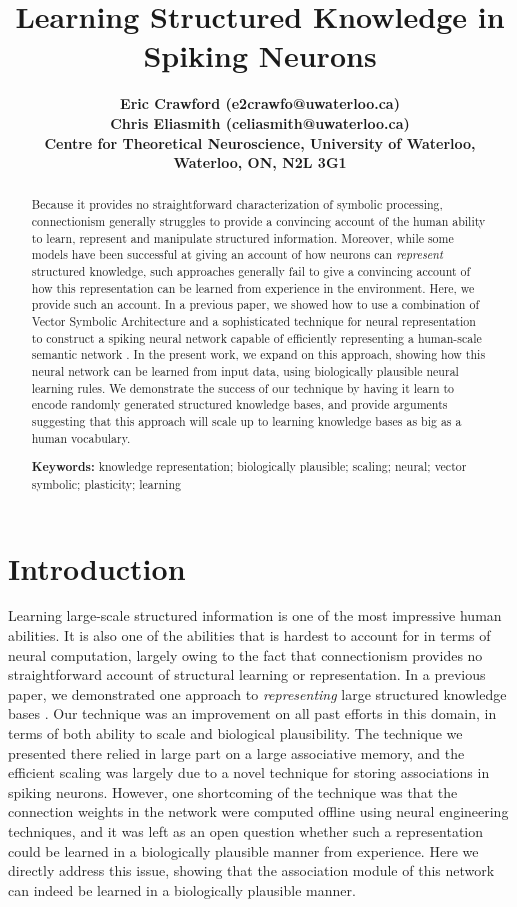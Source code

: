 \documentclass[10pt,letterpaper]{article}
\title{Learning Structured Knowledge in Spiking Neurons}
\author{\large \bf Eric Crawford (e2crawfo@uwaterloo.ca)\\
  \large \bf Chris Eliasmith (celiasmith@uwaterloo.ca)\\
  Centre for Theoretical Neuroscience, University of Waterloo,
  Waterloo, ON, N2L 3G1}
\begin{document}

\maketitle

\begin{abstract}
Because it provides no straightforward characterization of symbolic processing, connectionism generally struggles to provide a convincing account of the human ability to learn, represent and manipulate structured information. Moreover, while some models have been successful at giving an account of how neurons can \textit{represent} structured knowledge, such approaches generally fail to give a convincing account of how this representation can be learned from experience in the environment. Here, we provide such an account. In a previous paper, we showed how to use a combination of Vector Symbolic Architecture and a sophisticated technique for neural representation to construct a spiking neural network capable of efficiently representing a human-scale semantic network \citep{crawford2013}. In the present work, we expand on this approach, showing how this neural network can be learned from input data, using biologically plausible neural learning rules. We demonstrate the success of our technique by having it learn to encode randomly generated structured knowledge bases, and provide arguments suggesting that this approach will scale up to learning knowledge bases as big as a human vocabulary.

\textbf{Keywords:} 
knowledge representation; biologically plausible; scaling; neural; vector symbolic; plasticity; learning
\end{abstract}

\section{Introduction}
Learning large-scale structured information is one of the most impressive human abilities. It is also one of the abilities that is hardest to account for in terms of neural computation, largely owing to the fact that connectionism provides no straightforward account of structural learning or representation. In a previous paper, we demonstrated one approach to \textit{representing} large structured knowledge bases \citep{crawford2013}. Our technique was an improvement on all past efforts in this domain, in terms of both ability to scale and biological plausibility. The technique we presented there relied in large part on a large associative memory, and the efficient scaling was largely due to a novel technique for storing associations in spiking neurons. However, one shortcoming of the technique was that the connection weights in the network were computed offline using neural engineering techniques, and it was left as an open question whether such a representation could be learned in a biologically plausible manner from experience. Here we directly address this issue, showing that the association module of this network can indeed be learned in a biologically plausible manner.
\end{document}
